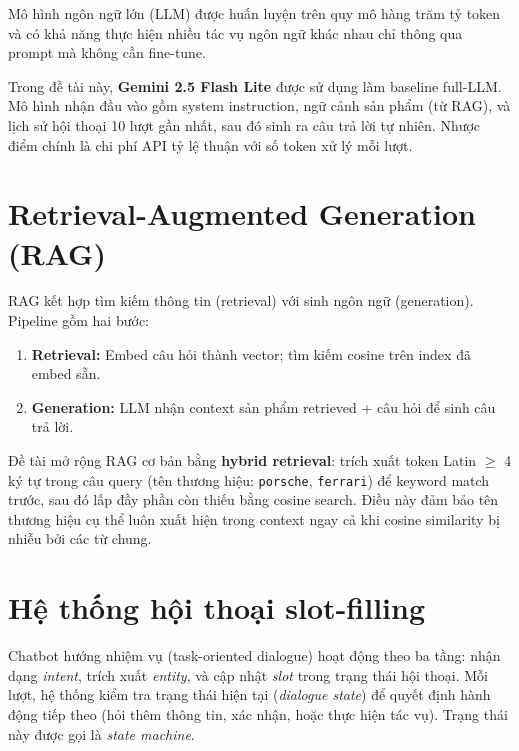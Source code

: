 \documentclass[12pt, a4paper]{report}
\begin{document}
Mô hình ngôn ngữ lớn (LLM) \cite{google2024gemini} được huấn luyện
trên quy mô hàng trăm tỷ token và có khả năng thực hiện
nhiều tác vụ ngôn ngữ khác nhau chỉ thông qua prompt
mà không cần fine-tune.

Trong đề tài này, \textbf{Gemini 2.5 Flash Lite}
được sử dụng làm baseline full-LLM.
Mô hình nhận đầu vào gồm system instruction, ngữ cảnh sản phẩm (từ RAG),
và lịch sử hội thoại 10 lượt gần nhất, sau đó sinh ra câu trả lời tự nhiên.
Nhược điểm chính là chi phí API tỷ lệ thuận với số token xử lý mỗi lượt.

\section{Retrieval-Augmented Generation (RAG)}

RAG \cite{lewis2020rag} kết hợp tìm kiếm thông tin (retrieval)
với sinh ngôn ngữ (generation). Pipeline gồm hai bước:

\begin{enumerate}
  \item \textbf{Retrieval:} Embed câu hỏi thành vector;
        tìm kiếm cosine trên index đã embed sẵn.
  \item \textbf{Generation:} LLM nhận context sản phẩm retrieved
        + câu hỏi để sinh câu trả lời.
\end{enumerate}

Đề tài mở rộng RAG cơ bản bằng \textbf{hybrid retrieval}:
trích xuất token Latin $\geq$ 4 ký tự trong câu query
(tên thương hiệu: \texttt{porsche}, \texttt{ferrari})
để keyword match trước, sau đó lấp đầy phần còn thiếu bằng cosine search.
Điều này đảm bảo tên thương hiệu cụ thể luôn xuất hiện trong context
ngay cả khi cosine similarity bị nhiễu bởi các từ chung.

\section{Hệ thống hội thoại slot-filling}

Chatbot hướng nhiệm vụ (task-oriented dialogue) hoạt động theo
ba tầng: nhận dạng \textit{intent}, trích xuất \textit{entity},
và cập nhật \textit{slot} trong trạng thái hội thoại.
Mỗi lượt, hệ thống kiểm tra trạng thái hiện tại (\textit{dialogue state})
để quyết định hành động tiếp theo (hỏi thêm thông tin, xác nhận,
hoặc thực hiện tác vụ). Trạng thái này được gọi là \textit{state machine}.

\end{document}
